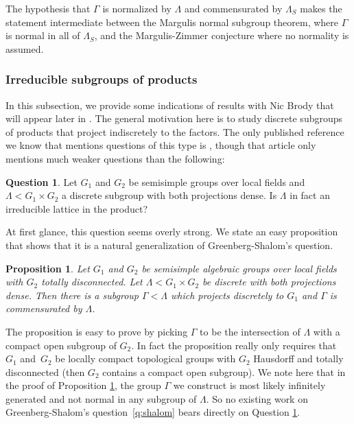 \documentclass[11pt]{article}
\numberwithin{equation}{section}\providecommand{\llangle}{\langle\!\langle}\providecommand{\rrangle}{\rangle\!\rangle}\providecommand{\Asterisk}{\ast}
\newtheorem{prop}[thm]{Proposition}
\theoremstyle{definition}
\newtheorem{question}[thm]{Question}
\begin{document}
\noindent The hypothesis that $\Gamma$ is normalized by $\Lambda$ and commensurated by $\Lambda_S$ makes the statement intermediate between the Margulis normal subgroup theorem, where $\Gamma$ is normal in all of $\Lambda_S$, and the Margulis-Zimmer conjecture where no normality is assumed.

\subsubsection{Irreducible subgroups of products}
\label{subsec:products}

In this subsection, we provide some indications of results with Nic Brody that will appear later in \cite{BFMVL}.
The general motivation here is to study discrete subgroups of products that project indiscretely to the factors.
The only published reference we know that mentions questions of this type is \cite{FLSS}, though that article
only mentions much weaker questions than the following:

\begin{question}
\label{qtn:irreducible}
Let $G_1$ and $G_2$ be semisimple groups over local fields and $\Lambda < G_1 \times G_2$ a discrete subgroup with both projections dense. Is $\Lambda$ in fact an irreducible lattice in the product?
\end{question}

At first glance, this question seems overly strong. We state an easy proposition that shows that it is a natural
generalization of Greenberg-Shalom's question.

\begin{prop}
\label{prop:shalomtoirreducible}
Let $G_1$ and $G_2$ be semisimple algebraic groups over local fields with $G_2$ totally disconnected. Let $\Lambda < G_1 \times G_2$ be discrete with both projections dense. Then there is a subgroup $\Gamma <\Lambda$ which projects discretely to $G_1$
and $\Gamma$ is commensurated by $\Lambda$.
\end{prop}

The proposition is easy to prove by picking $\Gamma$ to be the intersection of $\Lambda$ with a compact open subgroup
of $G_2$. In fact the proposition really only requires that~$G_1$ and~$G_2$ be locally compact topological groups with
$G_2$ Hausdorff and totally disconnected (then $G_2$ contains a compact open subgroup). We note here that in the proof of
Proposition \ref{prop:shalomtoirreducible}, the group $\Gamma$ we construct is most likely infinitely generated and
not normal in any subgroup of $\Lambda$. So no existing work on Greenberg-Shalom's question~\ref{q:shalom} bears directly on Question \ref{qtn:irreducible}.
\end{document}
